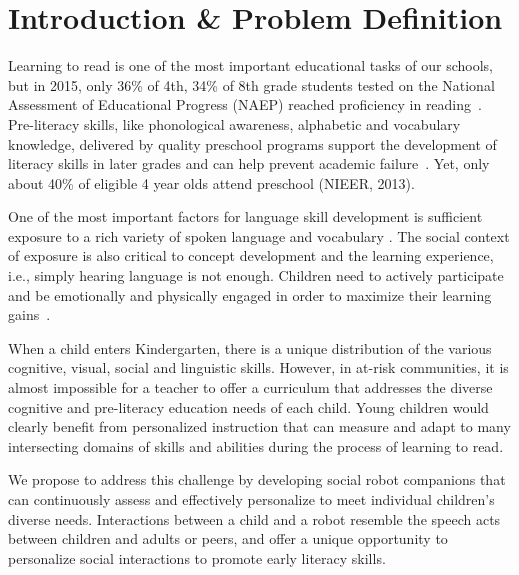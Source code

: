 


\section{Introduction \& Problem Definition}
 
Learning to read is one of the most important educational tasks of our schools, but in 2015, only 36\% of 4th, 34\% of 8th grade students tested on the National Assessment of Educational Progress (NAEP) reached proficiency in reading~\cite{nces2015}. Pre-literacy skills, like phonological awareness, alphabetic and vocabulary knowledge, delivered by quality preschool programs support the development of literacy skills in later grades and can help prevent academic failure~\cite{hart1995meaningful,paez2007dual}. Yet, only about 40\% of eligible 4 year olds attend preschool (NIEER, 2013).

One of the most important factors for language skill development is sufficient exposure to a rich variety of spoken language and vocabulary \cite{asaridou2016pace}. The social context of exposure is also critical to concept development and the learning experience, i.e., simply hearing language is not enough. Children need to actively participate and be emotionally and physically engaged in order to maximize their learning gains~\cite{wells2000dialogic}. 

When a child enters Kindergarten, there is a unique distribution of the various cognitive, visual, social and linguistic skills. However, in at-risk communities, it is almost impossible for a teacher to offer a curriculum that addresses the diverse cognitive and pre-literacy education needs of each child. Young children would clearly benefit from personalized instruction that can measure and adapt to many intersecting domains of skills and abilities during the process of learning to read. 

We propose to address this challenge by developing social robot companions that can continuously assess and effectively personalize to meet individual children's diverse needs. Interactions between a child and a robot resemble the speech acts between children and adults or peers, and offer a unique opportunity to personalize social interactions to promote early literacy skills.


